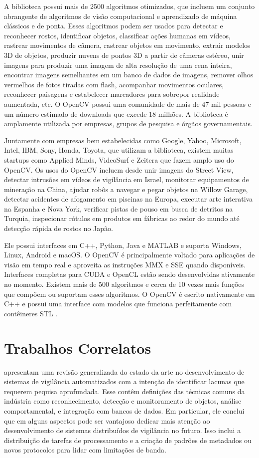 \documentclass[12pt, %
openright, 
oneside, %
a4paper,    %
brazil]{facom-ufu-abntex2}
\begin{document}
A biblioteca possui mais de 2500 algoritmos otimizados, que incluem um conjunto
abrangente de algoritmos de visão computacional e aprendizado de máquina
clássicos e de ponta. Esses algoritmos podem ser usados para detectar e
reconhecer rostos, identificar objetos, classificar ações humanas em vídeos,
rastrear movimentos de câmera, rastrear objetos em movimento, extrair modelos
3D de objetos, produzir nuvens de pontos 3D a partir de câmeras estéreo, unir
imagens para produzir uma imagem de alta resolução de uma cena inteira,
encontrar imagens semelhantes em um banco de dados de imagens, remover olhos
vermelhos de fotos tiradas com flash, acompanhar movimentos oculares,
reconhecer paisagens e estabelecer marcadores para sobrepor realidade
aumentada, etc. O OpenCV possui uma comunidade de mais de 47 mil pessoas e um
número estimado de downloads que excede 18 milhões. A biblioteca é amplamente
utilizada por empresas, grupos de pesquisa e órgãos governamentais.

Juntamente com empresas bem estabelecidas como Google, Yahoo, Microsoft, Intel,
IBM, Sony, Honda, Toyota, que utilizam a biblioteca, existem muitas startups
como Applied Minds, VideoSurf e Zeitera que fazem amplo uso do OpenCV. Os usos
do OpenCV incluem desde unir imagens do Street View, detectar intrusões em
vídeos de vigilância em Israel, monitorar equipamentos de mineração na China,
ajudar robôs a navegar e pegar objetos na Willow Garage, detectar acidentes de
afogamento em piscinas na Europa, executar arte interativa na Espanha e Nova
York, verificar pistas de pouso em busca de detritos na Turquia, inspecionar
rótulos em produtos em fábricas ao redor do mundo até detecção rápida de rostos
no Japão.

Ele possui interfaces em C++, Python, Java e MATLAB e suporta Windows, Linux,
Android e macOS. O OpenCV é principalmente voltado para aplicações de visão em
tempo real e aproveita as instruções MMX e SSE quando disponíveis. Interfaces
completas para CUDA e OpenCL estão sendo desenvolvidas ativamente no momento.
Existem mais de 500 algoritmos e cerca de 10 vezes mais funções que compõem ou
suportam esses algoritmos. O OpenCV é escrito nativamente em C++ e possui uma
interface com modelos que funciona perfeitamente com contêineres STL
\cite{opencvwebsite}.

\section{Trabalhos Correlatos}

 apresentam uma revisão generalizada do
estado da arte no desenvolvimento de sistemas de vigilância automatizados com a
intenção de identificar lacunas que requerem pequisa aprofundada. Esse contêm
definições das técnicas comuns da indústria como reconhecimento, detecção e
monitoramento de objetos, análise comportamental, e integração com bancos de
dados. Em particular, ele conclui que em alguns aspectos pode ser vantajoso
dedicar mais atenção ao desenvolvimento de sistemas distribuídos de vigilância
no futuro. Isso inclui a distribuição de tarefas de processamento e a criação
de padrões de metadados ou novos protocolos para lidar com limitações de banda.
\end{document}
